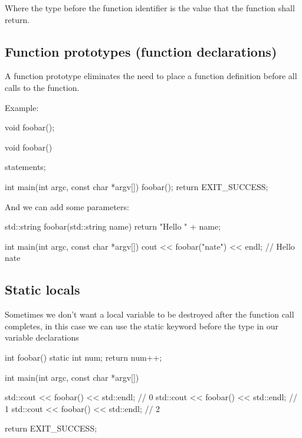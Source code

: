 \documentclass{report}
\begin{document}
    \bigbreak \noindent 
    Where the type before the function identifier is the value that the function shall return.
    \bigbreak \noindent 
    \subsection{Function prototypes (function declarations)}
    \bigbreak \noindent 
    \begin{concept}
 A function prototype eliminates the need to place a function definition before all calls to the function.
	\end{concept}
    \bigbreak \noindent 
    Example:
    \bigbreak \noindent 
    
    \begin{cppcode}
void foobar();

void foobar() {
    statements;

}
int main(int argc, const char *argv[]){ foobar(); return EXIT_SUCCESS; }
    \end{cppcode}
    
    \bigbreak \noindent 
    \bigbreak \noindent 
    And we can add some parameters:
    \bigbreak \noindent 
    
    \begin{cppcode}
std::string foobar(std::string name) {
    return "Hello " + name;
}  

int main(int argc, const char *argv[]){ cout << foobar("nate") << endl; } // Hello nate 
    \end{cppcode}
    

    \pagebreak \bigbreak \noindent 
    \subsection{Static locals}
    \bigbreak \noindent 
    Sometimes we don't want a local variable to be destroyed after the function call completes, in this case we can use the static keyword before the type in our variable declarations
    \bigbreak \noindent 
    
    \begin{cppcode}
int foobar() { static int num; return num++; }

int main(int argc, const char *argv[]) {
    std::cout << foobar() << std::endl; // 0
    std::cout << foobar() << std::endl; // 1
    std::cout << foobar() << std::endl; // 2

    return EXIT_SUCCESS;
}
    \end{cppcode}
    
\end{document}
